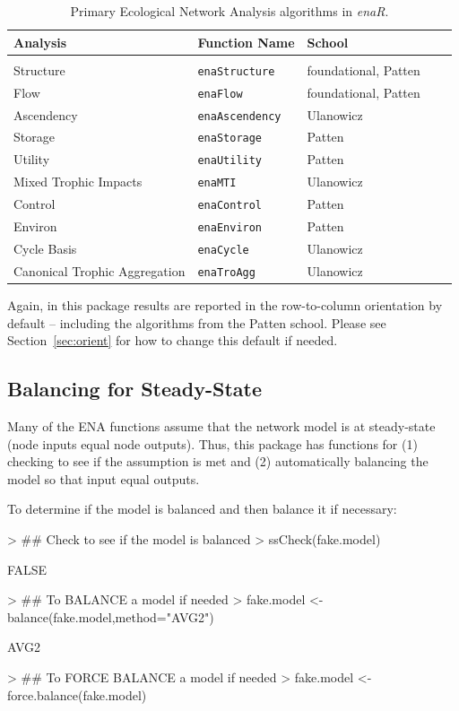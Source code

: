\documentclass[article]{jss}
\begin{document}
\begin{table}
\center
\caption{Primary Ecological Network Analysis algorithms in
  \textit{enaR}.} \label{tab:alg}
\tableline
\begin{tabular}{l l l l l }
\textbf{Analysis} & \textbf{Function Name} & \textbf{School} \\ \hline \\ [-1ex]
Structure & \texttt{enaStructure} & foundational, Patten \\
Flow & \texttt{enaFlow} & foundational, Patten \\
Ascendency & \texttt{enaAscendency} & Ulanowicz \\
Storage & \texttt{enaStorage} & Patten \\
Utility & \texttt{enaUtility} & Patten \\
Mixed Trophic Impacts & \texttt{enaMTI} & Ulanowicz \\
Control & \texttt{enaControl} & Patten \\
Environ & \texttt{enaEnviron} & Patten \\
Cycle Basis & \texttt{enaCycle} & Ulanowicz \\
Canonical Trophic Aggregation & \texttt{enaTroAgg} & Ulanowicz \\ \hline
\end{tabular}
\tableline
\end{table}

Again, in this package results are reported in the row-to-column
orientation by default -- including the algorithms from the Patten
school.  Please see Section~\ref{sec:orient} for how to change this
default if needed.

\subsection{Balancing for Steady-State}

Many of the ENA functions assume that the network model is at
steady-state (node inputs equal node outputs).  Thus, this package has
functions for (1) checking to see if the assumption is met and (2)
automatically balancing the model so that input equal outputs.

To determine if the model is balanced and then balance it if necessary:
\begin{Schunk}
\begin{Sinput}
> ## Check to see if the model is balanced
> ssCheck(fake.model)
\end{Sinput}
\begin{Soutput}
[1] FALSE
\end{Soutput}
\begin{Sinput}
> ## To BALANCE a model if needed
> fake.model <- balance(fake.model,method="AVG2")
\end{Sinput}
\begin{Soutput}
[1] AVG2
\end{Soutput}
\begin{Sinput}
> ## To FORCE BALANCE a model if needed
> fake.model <- force.balance(fake.model)
\end{Sinput}
\end{Schunk}
\end{document}
